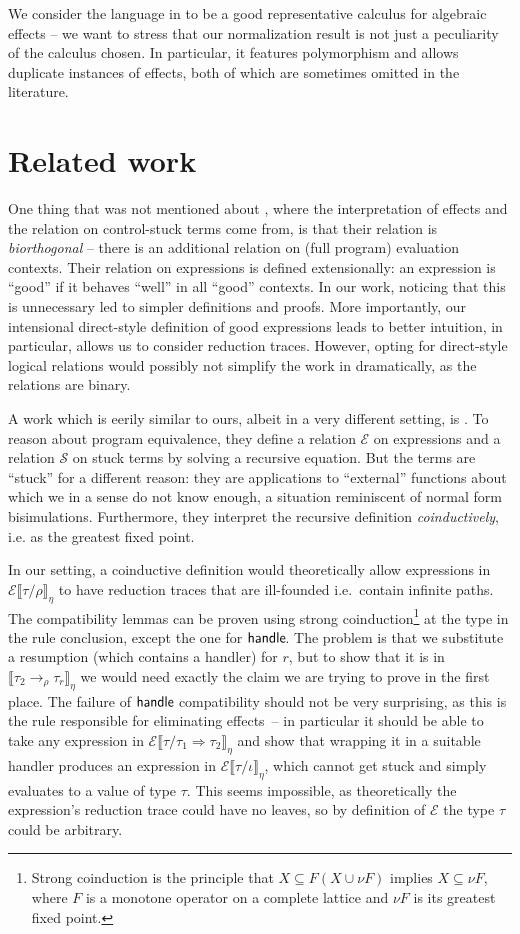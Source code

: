 \documentclass[a4paper, 11pt,titlepage, openright, twoside]{report}
\newcommand{\keyword}[1]{\textsf{\textup{#1}}}
\newcommand{\Handle}{\keyword{handle}\;}
\newcommand{\E}{\mathcal{E}}
\renewcommand{\S}{\mathcal{S}}
\newcommand{\+}{\enspace}
\begin{document}
We consider the language in \cite{hwc} to be a good representative
calculus for algebraic effects
– we want to stress that our normalization result is not just a
peculiarity of the calculus chosen.
In particular, it features polymorphism and allows duplicate instances of effects,
both of which are sometimes omitted in the literature.

\section{Related work}

One thing that was not mentioned about \cite{hwc}, where the interpretation of effects
and the relation on control-stuck terms come from,
is that their relation is {\em biorthogonal}
– there is an additional relation on (full program) evaluation contexts.
Their relation on expressions is defined extensionally:
an expression is ``good'' if it behaves ``well'' in all ``good'' contexts.
In our work, noticing that this is unnecessary led to simpler definitions and proofs.
More importantly, our intensional direct-style definition of good expressions leads to
better intuition, in particular, allows us to consider reduction traces.
However, opting for direct-style logical relations would possibly not simplify the work
in \cite{hwc} dramatically,
as the relations are binary.

A work which is eerily similar to ours, albeit in a very different setting, is \cite{marriage}.
To reason about program equivalence,
they define a relation $\E$ on expressions
and a relation $\S$ on stuck terms
by solving a recursive equation.
But the terms are ``stuck'' for a different reason:
they are applications to ``external'' functions about which we in a sense do not know enough,
a situation reminiscent of normal form bisimulations.
Furthermore, they interpret the recursive definition {\em coinductively},
i.e. as the greatest fixed point.

In our setting, a coinductive definition would theoretically allow
expressions in $\E⟦τ/ρ⟧_η$ to have reduction traces that are ill-founded
i.e.\ contain infinite paths.
The compatibility lemmas can be proven using strong coinduction\footnote{
	Strong coinduction is the principle that $X ⊆ F(X ∪ νF)$ implies $X ⊆ νF$,
	where $F$ is a monotone operator on a complete lattice and $νF$ is its greatest fixed point.
}
	at the type in the rule conclusion,
except the one for $\Handle\!\!$.
The problem is that we substitute a resumption
(which contains a handler) for $r$,
but to show that it is in $⟦τ_2 →_ρ τ_r⟧_η$
we would need exactly the claim we are trying to prove in the first place.
The failure of $\Handle\!\!$ compatibility should not be very surprising,
as this is the rule responsible for eliminating effects –
in particular it should be able to take
any expression in $\E⟦τ/τ_1 \Rightarrow τ_2⟧_η$ and show that wrapping it in a
suitable handler produces an expression in $\E⟦τ/ι⟧_η$, which cannot get
stuck and simply evaluates to a value of type $τ$.
This seems impossible,
as theoretically the expression's reduction trace could have no
leaves, so by definition of $\E$ the type $τ$ could be arbitrary.
\end{document}
